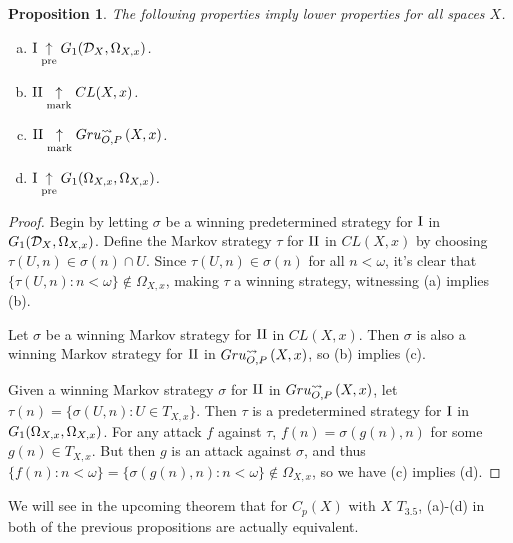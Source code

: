 \documentclass{amsart}
\theoremstyle{plain}
\newtheorem{proposition}[theorem]{Proposition}
\theoremstyle{definition}
\theoremstyle{remark}
\theoremstyle{plain}
\theoremstyle{definition}
\theoremstyle{remark}
\begin{document}
\begin{proposition}
 The following properties imply lower properties for all spaces \(X\).
 \begin{enumerate}[a)]
  \item \(\mathrm{I}\underset{\text{pre}}{\uparrow}G_{1}(\mathcal{D}_X,\Omega_{X,x})\).
  \item \(\mathrm{II}\underset{\text{mark}}{\uparrow} CL(X,x)\).
  \item \(\mathrm{II}\underset{\text{mark}}{\uparrow}Gru_{O,P}^{\leadsto}\left({X},{x}\right)\).
  \item \(\mathrm{I}\underset{\text{pre}}{\uparrow}G_{1}(\Omega_{X,x},\Omega_{X,x})\).
 \end{enumerate}
\end{proposition}
\begin{proof}
 Begin by letting \(\sigma\) be a winning predetermined strategy for \(\mathrm{I}\) in \(G_{1}(\mathcal{D}_X,\Omega_{X,x})\). 
 Define the Markov strategy \(\tau\) for \(\mathrm{II}\) in \(CL(X,x)\) by choosing \(\tau(U,n)\in\sigma(n)\cap U\). 
 Since \(\tau(U,n)\in\sigma(n)\) for all \(n<\omega\), it's clear that \(\{\tau(U,n):n<\omega\}\not\in\Omega_{X,x}\), making \(\tau\) a winning strategy, witnessing (a) implies (b).

 Let \(\sigma\) be a winning Markov strategy for \(\mathrm{II}\) in \(CL(X,x)\). Then \(\sigma\) is also a winning Markov strategy for \(\mathrm{II}\) in \(Gru_{O,P}^{\leadsto}\left({X},{x}\right)\), so (b) implies (c).

 Given a winning Markov strategy \(\sigma\) for \(\mathrm{II}\) in \(Gru_{O,P}^{\leadsto}\left({X},{x}\right)\), let \(\tau(n)=\{\sigma(U,n):U\in T_{X,x}\}\). 
 Then \(\tau\) is a predetermined strategy for \(\mathrm{I}\) in \(G_{1}(\Omega_{X,x},\Omega_{X,x})\). 
 For any attack \(f\) against \(\tau\), \(f(n)=\sigma(g(n),n)\) for some \(g(n)\in T_{X,x}\). 
 But then \(g\) is an attack against \(\sigma\), and thus \(\{f(n):n<\omega\}=\{\sigma(g(n),n):n<\omega\}\not\in\Omega_{X,x}\), so we have (c) implies (d).
\end{proof}

We will see in the upcoming theorem that for \(C_p(X)\) with \(X\) \(T_{3.5}\), (a)-(d) in both of the previous propositions are actually equivalent.
\end{document}
